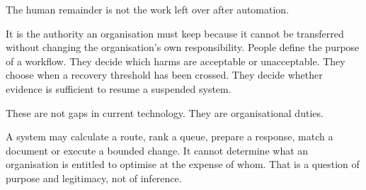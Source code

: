 The human remainder is not the work left over after automation.

It is the authority an organisation must keep because it cannot be
transferred without changing the organisation's own responsibility.
People define the purpose of a workflow. They decide which harms are
acceptable or unacceptable. They choose when a recovery threshold has
been crossed. They decide whether evidence is sufficient to resume a
suspended system.

These are not gaps in current technology. They are organisational
duties.

A system may calculate a route, rank a queue, prepare a response, match
a document or execute a bounded change. It cannot determine what an
organisation is entitled to optimise at the expense of whom. That is a
question of purpose and legitimacy, not of inference.
